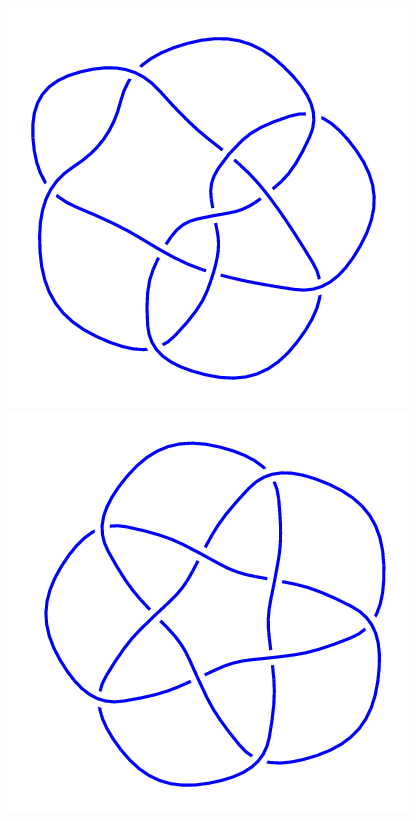 \begin{figure}[H]
	\begin{minipage}[b]{.18\linewidth}
		\centering
		\includegraphics[width=\linewidth]{../data/10_122.png}
	\end{minipage}
	\begin{minipage}[b]{.18\linewidth}
		\centering
		\includegraphics[width=\linewidth]{../data/10_123.png}

\end{minipage}
\end{figure}
